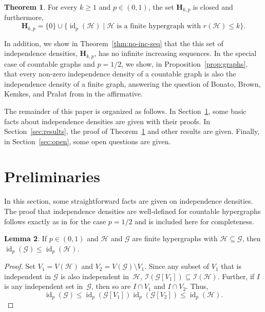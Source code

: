 \documentclass[11pt,reqno]{amsart}
\theoremstyle{definition}
\newtheorem{theorem}{Theorem}
\newtheorem{lemma}[theorem]{Lemma}
\begin{document}
\begin{theorem}\label{thm:closed-finite}
For every $k \geq 1$ and $p \in (0,1)$, the set $\mathbf{H}_{k,p}$ is closed and furthermore,
\[
 \mathbf{H}_{k,p} = \{0\} \cup \{{\operatorname{id}}_p(\mathcal{H}) \mid \mathcal{H} \text{ is a finite hypergraph with } r(\mathcal{H}) \leq k\}.
\]
\end{theorem}

In addition, we show in Theorem~\ref{thm:no-inc-seq} that the this set of independence densities, $\mathbf{H}_{k,p}$, has no infinite increasing sequences. In the special case of countable graphs and $p = 1/2$, we show, in Proposition~\ref{prop:graphs}, that every non-zero independence density of a countable graph is also the independence density of a finite graph, answering the question of Bonato, Brown, Kemkes, and Pra{\l}at from \cite{BBKP11} in the affirmative.

The remainder of this paper is organized as follows. In Section~\ref{sec:prelim}, some basic facts about independence densities are given with their proofs. In Section~\ref{sec:results}, the proof of Theorem~\ref{thm:closed-finite} and other results are given.  Finally, in Section~\ref{sec:open}, some open questions are given.

\section{Preliminaries}\label{sec:prelim}

In this section, some straightforward facts are given on independence densities. The proof that independence densities are well-defined for countable hypergraphs follows exactly as in \cite{BBMP14} for the case $p = 1/2$ and is included here for completeness.

\begin{lemma}\label{lem:sub-hyp}
If $p \in (0,1)$ and $\mathcal{H}$ and $\mathcal{G}$ are finite hypergraphs with $\mathcal{H} \subseteq \mathcal{G}$, then ${\operatorname{id}}_p(\mathcal{G}) \leq {\operatorname{id}}_p(\mathcal{H})$.
\end{lemma}
\begin{proof}
Set $V_1 = V(\mathcal{H})$ and $V_2 = V(\mathcal{G}) \setminus V_1$. Since any subset of $V_1$ that is independent in $\mathcal{G}$ is also independent in~$\mathcal{H}$, $\mathcal{I}(\mathcal{G}[V_1]) \subseteq \mathcal{I}(\mathcal{H})$. Further, if $I$ is any independent set in~$\mathcal{G}$, then so are $I \cap V_1$ and $I \cap V_2$. Thus,
\[
{\operatorname{id}}_p(\mathcal{G}) \leq {\operatorname{id}}_p(\mathcal{G}[V_1]) {\operatorname{id}}_p(\mathcal{G}[V_2]) \leq {\operatorname{id}}_p(\mathcal{H}).
\]
\end{proof}
\end{document}
